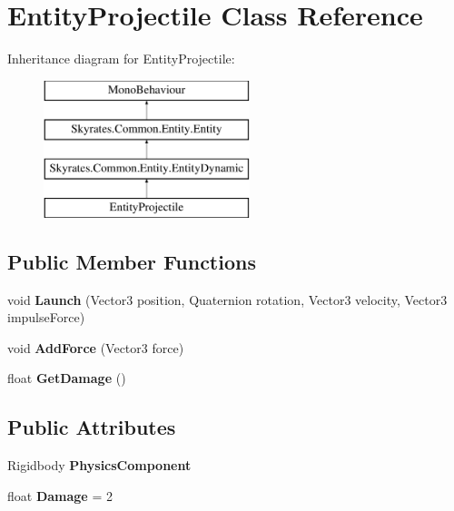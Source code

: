 \hypertarget{class_entity_projectile}{\section{Entity\-Projectile Class Reference}
\label{class_entity_projectile}
}
Inheritance diagram for Entity\-Projectile\-:\begin{figure}[H]
\begin{center}
\leavevmode
\includegraphics[height=4.000000cm]{class_entity_projectile}
\end{center}
\end{figure}
\subsection*{Public Member Functions}
\begin{DoxyCompactItemize}
\item 
\hypertarget{class_entity_projectile_ada869ac9caf8c4da53c53ac50d04cef5}{void {\bfseries Launch} (Vector3 position, Quaternion rotation, Vector3 velocity, Vector3 impulse\-Force)}\label{class_entity_projectile_ada869ac9caf8c4da53c53ac50d04cef5}

\item 
\hypertarget{class_entity_projectile_a028b344e40b3db9dd418110412dd81b7}{void {\bfseries Add\-Force} (Vector3 force)}\label{class_entity_projectile_a028b344e40b3db9dd418110412dd81b7}

\item 
\hypertarget{class_entity_projectile_ab800c5f6f125d81a48b7220629414a68}{float {\bfseries Get\-Damage} ()}\label{class_entity_projectile_ab800c5f6f125d81a48b7220629414a68}

\end{DoxyCompactItemize}
\subsection*{Public Attributes}
\begin{DoxyCompactItemize}
\item 
\hypertarget{class_entity_projectile_af5d50c3e4c16e3106fedd51f99e21d9a}{Rigidbody {\bfseries Physics\-Component}}\label{class_entity_projectile_af5d50c3e4c16e3106fedd51f99e21d9a}

\item 
\hypertarget{class_entity_projectile_a0ed44c0b9f792d5502514fd30c85b42b}{float {\bfseries Damage} = 2}\label{class_entity_projectile_a0ed44c0b9f792d5502514fd30c85b42b}

\end{DoxyCompactItemize}
